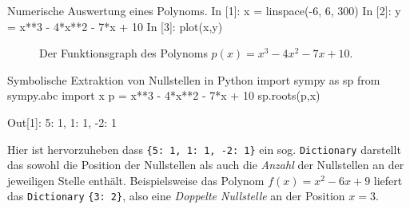 
\begin{python}{Numerische Auswertung eines Polynoms.}
In [1]: x = linspace(-6, 6, 300)
In [2]: y = x**3 - 4*x**2 - 7*x + 10
In [3]: plot(x,y)
\end{python}



\begin{figure}[h]
	\centering
	
	\caption{Der Funktionsgraph des Polynoms  $p(x) = x^3 - 4x^2 - 7x + 10$.}
	\label{fig:poly1}
\end{figure}







\begin{python}{Symbolische Extraktion von Nullstellen in Python}
import sympy as sp
from sympy.abc import x
p = x**3 - 4*x**2 - 7*x + 10
sp.roots(p,x)

Out[1]: {5: 1, 1: 1, -2: 1}
\end{python}

Hier ist hervorzuheben dass \texttt{\{5: 1, 1: 1, -2: 1\}} ein sog. \texttt{Dictionary} darstellt das sowohl die Position der Nullstellen als auch die \emph{Anzahl} der Nullstellen an der jeweiligen Stelle enthält. 
Beispielsweise das Polynom $f(x) = x^2 - 6x + 9$ liefert das \texttt{Dictionary} \texttt{\{3: 2\}}, also eine \emph{Doppelte Nullstelle} an der Position $x=3$. 





